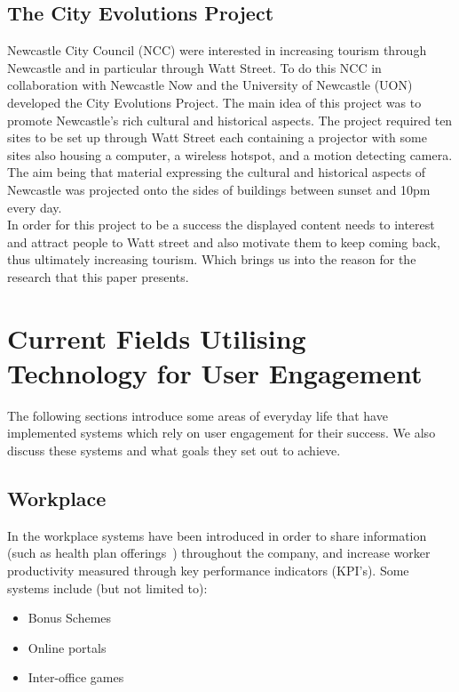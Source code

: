 \documentclass[a4paper,12pt]{article}
\begin{document}
\subsection{The City Evolutions Project}
Newcastle City Council (NCC) were interested in increasing tourism through Newcastle and in particular through Watt Street. To do this NCC in collaboration with Newcastle Now and the University of Newcastle (UON) developed the City Evolutions Project. The main idea of this project was to promote Newcastle's rich cultural and historical aspects. 
The project required ten sites to be set up through Watt Street each containing a projector with some sites also housing a computer, a wireless hotspot, and a motion detecting camera. The aim being that material expressing the cultural and historical aspects of Newcastle was projected onto the sides of buildings between sunset and 10pm every day.\\
In order for this project to be a success the displayed content needs to interest and attract people to Watt street and also motivate them to keep coming back, thus ultimately increasing tourism. Which brings us into the reason for the research that this paper presents.

\section{Current Fields Utilising Technology for User Engagement}\label{sec:current-fields}
The following sections introduce some areas of everyday life that have implemented systems which rely on user engagement for their success. We also discuss these systems and what goals they set out to achieve.

\subsection{Workplace}

In the workplace systems have been introduced in order to share information (such as health plan offerings~\citep{taxonomy-of-gamification})  throughout the company, and increase worker productivity measured through key performance indicators (KPI's).
Some systems include (but not limited to):
\begin{itemize}
	\item{Bonus Schemes}
	\item{Online portals~\citep{taxonomy-of-gamification}}
	\item{Inter-office games~\citep{taskville}}
\end{itemize}
\end{document}
